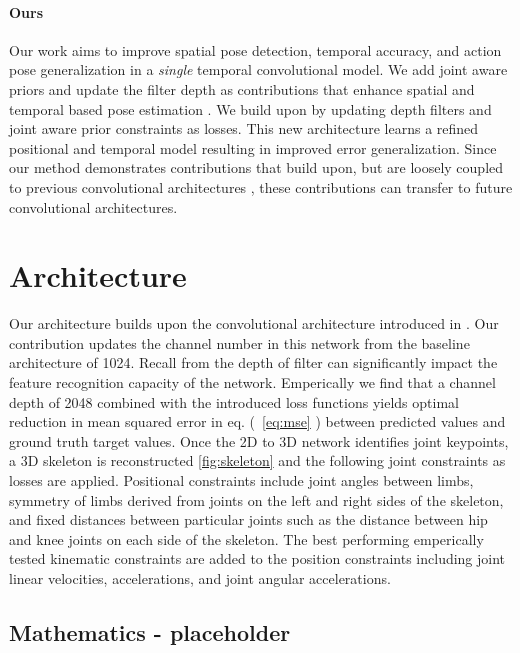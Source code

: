 \documentclass[runningheads]{llncs}
\begin{document}
\paragraph{Ours}Our work aims to improve spatial pose detection, temporal accuracy, and action pose generalization in a \textit{single} temporal convolutional model.  We add joint aware priors and update the filter depth \cite{krizhevsky2012imagenet} as contributions that enhance spatial \cite{chen2018cascaded} and temporal based pose estimation \cite{pavllo20193d}.  We build upon \cite{pavllo20193d} by updating depth filters and joint aware prior constraints as losses. This new architecture learns a refined positional and temporal model resulting in improved error generalization.  Since our method demonstrates contributions that build upon, but are loosely coupled to previous convolutional architectures \cite{pavllo20193d}, these contributions can transfer to future convolutional architectures.

\section{Architecture}

Our architecture builds upon the convolutional architecture introduced in \cite{pavllo20193d}. Our contribution updates the channel number in this network from the baseline architecture of 1024. Recall from \cite{krizhevsky2012imagenet} the depth of filter can significantly impact the feature recognition capacity of the network. Emperically we find that a channel depth of 2048 combined with the introduced loss functions yields optimal reduction in mean squared error in eq. (~\ref{eq:mse} ) between predicted  values and ground truth target values. Once the 2D to 3D network identifies joint keypoints, a 3D skeleton is reconstructed \ref{fig:skeleton} and the following joint constraints as losses are applied. Positional constraints include joint angles between limbs, symmetry of limbs derived from joints on the left and right sides of the skeleton, and fixed distances between particular joints such as the distance between hip and knee joints on each side of the skeleton. The best performing emperically tested kinematic constraints are added to the position constraints including joint linear velocities, accelerations, and joint angular accelerations. 

\iffalse
\subsection{Mathematics - placeholder}
\end{document}
